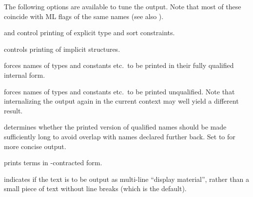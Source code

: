 \begin{isabellebody}
\begin{isamarkuptext}
\begin{descr}
  \end{descr}

  \medskip
  The following options are available to tune the output.  Note that most of
  these coincide with ML flags of the same names (see also \cite{isabelle-ref}).

  \begin{descr}

  \item[\isa{{\isachardoublequote}show{\isacharunderscore}types\ {\isacharequal}\ bool{\isachardoublequote}} and \isa{{\isachardoublequote}show{\isacharunderscore}sorts\ {\isacharequal}\ bool{\isachardoublequote}}]
  control printing of explicit type and sort constraints.

  \item[\isa{{\isachardoublequote}show{\isacharunderscore}structs\ {\isacharequal}\ bool{\isachardoublequote}}] controls printing of implicit
  structures.

  \item[\isa{{\isachardoublequote}long{\isacharunderscore}names\ {\isacharequal}\ bool{\isachardoublequote}}] forces names of types and
  constants etc.\ to be printed in their fully qualified internal
  form.

  \item[\isa{{\isachardoublequote}short{\isacharunderscore}names\ {\isacharequal}\ bool{\isachardoublequote}}] forces names of types and
  constants etc.\ to be printed unqualified.  Note that internalizing
  the output again in the current context may well yield a different
  result.

  \item[\isa{{\isachardoublequote}unique{\isacharunderscore}names\ {\isacharequal}\ bool{\isachardoublequote}}] determines whether the printed
  version of qualified names should be made sufficiently long to avoid
  overlap with names declared further back.  Set to  for
  more concise output.

  \item[\isa{{\isachardoublequote}eta{\isacharunderscore}contract\ {\isacharequal}\ bool{\isachardoublequote}}] prints terms in \isa{{\isasymeta}}-contracted form.

  \item[\isa{{\isachardoublequote}display\ {\isacharequal}\ bool{\isachardoublequote}}] indicates if the text is to be
  output as multi-line ``display material'', rather than a small piece
  of text without line breaks (which is the default).


\end{descr}
\end{isamarkuptext}
\end{isabellebody}

